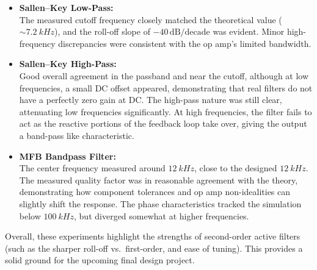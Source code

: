 \documentclass[12pt]{article}
\begin{document}
\begin{itemize}

	\item \textbf{Sallen--Key Low-Pass:}\\
	      The measured cutoff frequency closely matched the theoretical value
	      ($\sim\SI{7.2}{kHz}$), and the roll-off slope of $-40\,\mathrm{dB/decade}$ was
	      evident. Minor high-frequency discrepancies were consistent with the op amp’s
	      limited bandwidth.

	\item \textbf{Sallen--Key High-Pass:}\\
	      Good overall agreement in the passband and near the cutoff, although
	      at low frequencies, a small DC offset appeared, demonstrating that real filters
	      do not have a perfectly zero gain at DC. The high-pass nature was still clear,
	      attenuating low frequencies significantly. At high frequencies, the filter fails
	      to act as the reactive portions of the feedback loop take over, giving the
	      output a band-pass like characteristic.

	\item \textbf{MFB Bandpass Filter:}\\
	      The center frequency measured around $\SI{12}{kHz}$, close to the designed
	      $\SI{12}{kHz}$. The measured quality factor was in reasonable agreement with the
	      theory, demonstrating how component tolerances and op amp non-idealities can
	      slightly shift the response. The phase characteristics tracked the simulation
	      below $\SI{100}{kHz}$, but diverged somewhat at higher frequencies.
\end{itemize}

Overall, these experiments highlight the strengths of second-order active
filters (such as the sharper roll-off vs.\ first-order, and ease of tuning).
This provides a solid ground for the upcoming final design project.
\end{document}
